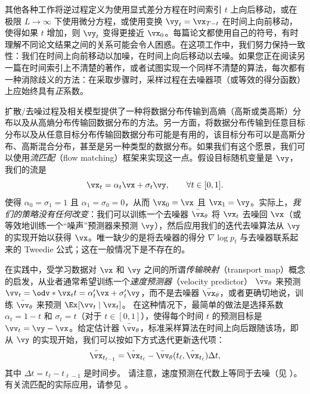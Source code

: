 \documentclass[../../book-main_zh.tex]{subfiles}
\begin{document}
\begin{remark}
    其他各种工作将逆过程定义为使用显式差分方程在时间索引 \(t\) 上向后移动，或在极限 \(L \to \infty\) 下使用微分方程，或使用变换 \(\vy_{t} = \vx_{T - t}\) 在时间上向前移动，使得如果 \(t\) 增加，则 \(\vy_{t}\) 变得更接近 \(\vx_{0}\)。每篇论文都使用自己的符号，有时理解不同论文结果之间的关系可能会令人困惑。在这项工作中，我们努力保持一致性：我们在时间上向前移动以加噪，在时间上向后移动以去噪。如果您正在阅读另一篇在时间索引上不清楚的著作，或者试图实现一个同样不清楚的算法，每次都有一种消除歧义的方法：在采取步骤时，采样过程在去噪器项（或等效的得分函数）上应始终具有\textit{正}系数。
\end{remark}

\begin{remark}\label{rem:flow_matching}
    扩散/去噪过程及相关模型提供了一种将数据分布传输到高熵（高斯或类高斯）分布以及从高熵分布传输回数据分布的方法。另一方面，将数据分布传输到任意目标分布以及从任意目标分布传输回数据分布可能是有用的，该目标分布可以是高斯分布、高斯混合分布，甚至是另一种类型的数据分布。如果我们有这个愿景，我们可以使用\textit{流匹配}（flow matching）框架来实现这一点。假设目标随机变量是 \(\vy\)，我们的流是
    \begin{equation}
        \vx_{t} = \alpha_{t}\vx + \sigma_{t}\vy, \qquad \forall t \in [0, 1].
    \end{equation}
    使得 \(\alpha_{0} = \sigma_{1} = 1\) 且 \(\alpha_{1} =
    \sigma_{0} = 0\)，从而 \(\vx_{0} = \vx\) 且 \(\vx_{1} =
    \vy\)。实际上，\textit{我们的策略没有任何改变}：我们可以训练一个去噪器 \(\bar{\vx}_{\theta}\) 将 \(\vx_{t}\) 去噪回 \(\vx\)（或等效地训练一个“噪声”预测器来预测 \(\vy\)），然后应用我们的迭代去噪算法从 \(\vy\) 的实现开始以获得 \(\vx\)。唯一缺少的是将去噪器的得分 \(\nabla \log p_{t}\) 与去噪器联系起来的 Tweedie 公式；这在一般情况下是不存在的。

    在实践中，受学习数据对 \(\vx\) 和 \(\vy\) 之间的所谓\textit{传输映射}（transport map）概念的启发，从业者通常希望训练一个\textit{速度预测器}（velocity predictor）
    \(\bar{\vv}_{\theta}\) 来预测 \(\vv_{t} = \odv*{\vx_{t}}{t} =
    \alpha_{t}^{\prime}\vx + \sigma_{t}^{\prime}\vy\)，而不是去噪器 \(\bar{\vx}_{\theta}\)，或者更确切地说，训练
    \(\bar{\vv}_{\theta}\) 来预测 \(\Ex[\vv_{t} \mid \vx_{t}]\)。
    在这种情况下，最简单的做法是选择系数 \(\alpha_{t} = 1 - t\) 和
    \(\sigma_{t} = t\)（对于 \(t \in [0, 1]\)），使得每个时间 \(t\) 的预测目标是 \(\vv_{t} = \vy - \vx\)。给定估计器 \(\bar{\vv}_{\theta}\)，标准采样算法在时间上向后跟随该场，即从 \(\vy\) 的实现开始，我们可以按如下方式迭代更新迭代项：
    \begin{equation}
        \hat{\vx}_{t_{\ell - 1}} = \hat{\vx}_{t_{\ell}} -
        \bar{\vv}_{\theta}(t_{\ell}, \hat{\vx}_{t_{\ell}}) \Delta t,
    \end{equation}
    其中 \(\Delta t = t_{\ell} - t_{\ell - 1}\) 是时间步。
    请注意，速度预测在代数上等同于去噪（见 ）。有关流匹配的实际应用，请参见
    。
\end{remark}
\end{document}
